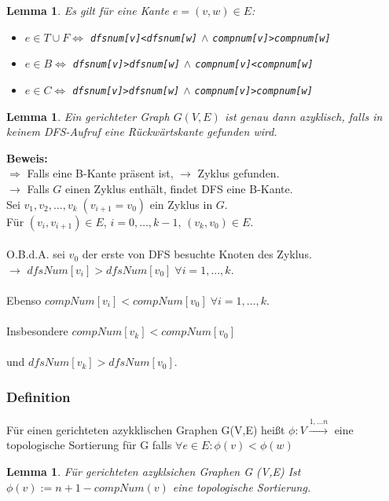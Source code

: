 \documentclass{article}
\newtheorem{lem}[thm]{Lemma}
\begin{document}
\begin{lem}
	Es gilt für eine Kante $e=(v,w)\in E$:
	\begin{itemize}
		\item $e\in T\cup F \Leftrightarrow $ \texttt{dfsnum[v]<dfsnum[w]} $\land$ \texttt{compnum[v]>compnum[w]}
		\item $e\in B \Leftrightarrow $ \texttt{dfsnum[v]>dfsnum[w]} $\land$ \texttt{compnum[v]<compnum[w]}
		\item $e\in C \Leftrightarrow $ \texttt{dfsnum[v]>dfsnum[w]} $\land$ \texttt{compnum[v]>compnum[w]}
	\end{itemize}
\end{lem}

\begin{lem}
Ein gerichteter Graph $G(V,E)$ ist genau dann azyklisch, falls in keinem DFS-Aufruf
eine Rückwärtskante gefunden wird.
\end{lem}
\textbf{Beweis:} \newline \\
$\Rightarrow$ Falls eine B-Kante präsent ist, $\rightarrow$ Zyklus gefunden. \newline \\
$\rightarrow$ Falls $G$ einen Zyklus enthält, findet DFS eine B-Kante. \newline \\
Sei $v_1 , v_2 , \dots, v_k \; (v_{i+1} = v_0)$ ein Zyklus in $G$. \\
\newline
Für $(v_i , v_{i+1}) \in E$, $i= 0, \dots, k-1$, $(v_k, v_0) \in E$.\\ \\
O.B.d.A. sei $v_0$ der erste von DFS besuchte Knoten des Zyklus. \newline \\
$\rightarrow$ $dfsNum[v_i] > dfsNum[v_0] \; \forall i= 1, \dots, k$.\\ \\
Ebenso $compNum[v_i] < compNum[v_0] \; \forall i= 1, \dots, k$. \\ \\
Insbesondere $compNum[v_k] < compNum[v_0]$ \\ \\
und $dfsNum[v_k] > dfsNum[v_0]$.

\subsubsection{Definition}
Für einen gerichteten azykklischen Graphen G(V,E) heißt $\phi: V \xrightarrow{1,\dots n}$ eine topologische Sortierung für G falls $\forall e \in E: \phi(v) < \phi(w)$
\begin{lem}
    Für gerichteten azyklsichen Graphen G (V,E) Ist $\phi (v) := n+1 -compNum(v)$ eine topologische Sortierung. \\
\end{lem} 
\end{document}
